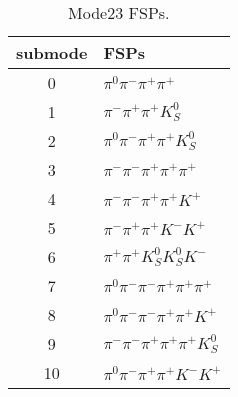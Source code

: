 \begin{table}[h!]
\begin{center}
\begin{tabular}{cl}
\hline
submode& FSPs\\
\hline
0 & $\pi^0 \pi^- \pi^+ \pi^+ $ \\
1 & $\pi^- \pi^+ \pi^+ K_S^0 $ \\
2 & $\pi^0 \pi^- \pi^+ \pi^+ K_S^0 $ \\
3 & $\pi^- \pi^- \pi^+ \pi^+ \pi^+ $ \\
4 & $\pi^- \pi^- \pi^+ \pi^+ K^+ $ \\
5 & $\pi^- \pi^+ \pi^+ K^- K^+ $ \\
6 & $\pi^+ \pi^+ K_S^0 K_S^0 K^- $ \\
7 & $\pi^0 \pi^- \pi^- \pi^+ \pi^+ \pi^+ $ \\
8 & $\pi^0 \pi^- \pi^- \pi^+ \pi^+ K^+ $ \\
9 & $\pi^- \pi^- \pi^+ \pi^+ \pi^+ K_S^0 $ \\
10 & $\pi^0 \pi^- \pi^+ \pi^+ K^- K^+ $ \\
\hline
\end{tabular}
\label{tab:Mode23FSPs}
\caption{Mode23 FSPs.}
\end{center}
\end{table}
